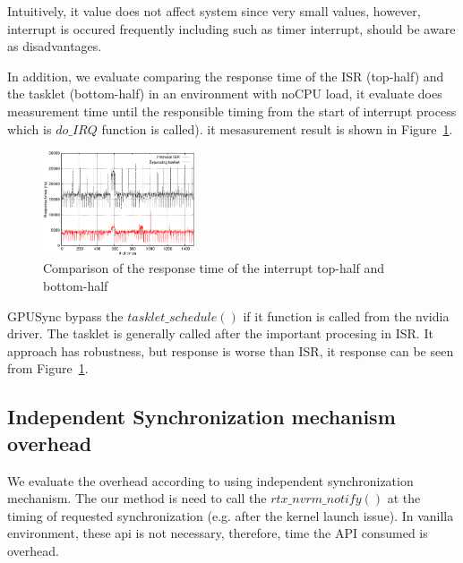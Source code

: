 Intuitively, it value does not affect system since very small values,
however, interrupt is occured frequently including such as timer interrupt, should be aware as disadvantages.

In addition, we evaluate comparing the response time of the ISR (top-half) and the tasklet (bottom-half) in an environment with noCPU load,
it evaluate does measurement time until the responsible timing from the start of interrupt process which is $do\_IRQ$ function is called).
it mesasurement result is shown in Figure~\ref{fig:bottomvstasklet}.

\begin{figure}[t]
\begin{center}
\includegraphics[width=0.4\textwidth]{img/tasklet_vs_interrupt}
\caption{Comparison of the response time of the interrupt top-half and bottom-half}
\end{center}
\label{fig:bottomvstasklet}
\end{figure}

GPUSync bypass the $tasklet\_schedule()$ if it function is called from the nvidia driver.
The tasklet is generally called after the important procesing in ISR.
It approach has robustness, but response is worse than ISR, it response can be seen from Figure~\ref{fig:bottomvstasklet}.



\subsection{Independent Synchronization mechanism overhead}
We evaluate the overhead according to using independent synchronization mechanism.
The our method is need to call the $rtx\_nvrm\_notify()$ at the timing of requested synchronization (e.g. after the kernel launch issue). 
In vanilla environment, these api is not necessary, therefore, time the API consumed is overhead.

